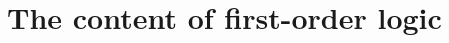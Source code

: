 \begin{comment}
Hence, if we know this: 
	\begin{earg}
		\item[1.] If Mary was arrested, then Peter when to the police. 
	\end{earg}
and this: 
	\begin{earg}
		\item[2.] Mary was arrested. 
	\end{earg}
Then, we know that this can safely be inferred:  
	\begin{earg}
		\item[3.] Peter went to the police.
	\end{earg} 
And if we want to symbolize this in TFL, we can easily do so:
\begin{earg}
\item[1.] $M \eif P$
\item[2.] $M$
\item[3.] $P$
\end{earg}
Here, however, is a valid argument that cannot be represented using TFL.
\begin{earg}
\item[1.] All humans are mortal.
\item[2.] Peter is a human.
\item[3.] Therefore, Peter is mortal. 
\end{earg}
Since there are no logical operators in any of these three sentences, if we tried to symbolize the argument, we would just have three seemingly unrelated atomic sentences:

\noindent\begin{minipage}{0.99\textwidth}
\bigskip
\begin{earg}
\item[1.] $H$
\item[2.] $P$
\item[3.] $M$
\end{earg}
\smallskip
\end{minipage}

\noindent So represented, this argument is invalid. First-order logic, however, will give us the means to represent it---and many others---as a valid argument.

\end{comment}


\section{The content of first-order logic}

